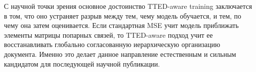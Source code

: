 С научной точки зрения основное достоинство TTED-aware training заключается в том, что оно устраняет разрыв между тем, чему модель обучается, и тем, по чему она затем оценивается. Если стандартная MSE учит модель приближать элементы матрицы попарных связей, то TTED-aware подход учит ее восстанавливать глобально согласованную иерархическую организацию документа. Именно это делает данное направление естественным и сильным кандидатом для последующей научной публикации.